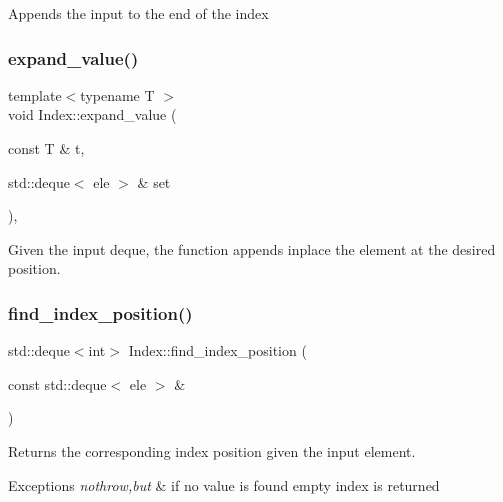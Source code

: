 Appends the input to the end of the index \mbox{\label{classIndex_a5089996517fe6b536d141ffa46436a11}} 
\subsubsection{\texorpdfstring{expand\+\_\+value()}{expand\_value()}}
{\footnotesize\ttfamily template$<$typename T $>$ \\
void Index\+::expand\+\_\+value (\begin{DoxyParamCaption}\item[{const T \&}]{t,  }\item[{std\+::deque$<$ ele $>$ \&}]{set }\end{DoxyParamCaption})\hspace{0.3cm}{\ttfamily [inline]}, {\ttfamily [private]}}

Given the input deque, the function appends inplace the element at the desired position. \mbox{\label{classIndex_aecbb6761b8f0e47aa4d89ce98ef4466c}} 
\subsubsection{\texorpdfstring{find\+\_\+index\+\_\+position()}{find\_index\_position()}}
{\footnotesize\ttfamily std\+::deque$<$int$>$ Index\+::find\+\_\+index\+\_\+position (\begin{DoxyParamCaption}\item[{const std\+::deque$<$ ele $>$ \&}]{ }\end{DoxyParamCaption})}



Returns the corresponding index position given the input element. 


\begin{DoxyExceptions}{Exceptions}
{\em nothrow,but} & if no value is found empty index is returned \\
\hline
\end{DoxyExceptions}
\mbox{\label{classIndex_aa9a4aad39f0d19334fd2a144092b8004}} 
